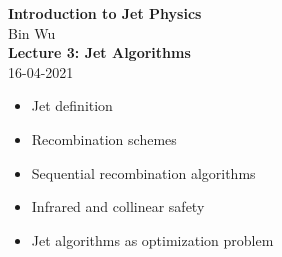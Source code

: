 \documentclass[9pt,a4paper,unknownkeysallowed,xcolor=dvipsnames,aspectratio=43]{beamer}
\begin{document}
\begin{frame}
\vspace*{\fill}
\begin{center}
{\Huge\bf\color{darkred} Introduction to Jet Physics}\\
\vspace{4mm}
    Bin Wu\\
    \vspace{8mm}
    {\bf\Large Lecture 3: Jet Algorithms}\\\vspace{4mm}
    {\color{darkblue} 16-04-2021}
\end{center}
\vspace{4mm}
\begin{itemize}
    \item[\color{darkred}\Large\bullet] Jet definition
    \vspace{2mm}
    \item[\color{darkred}\Large\bullet] Recombination schemes
    \vspace{2mm}
    \item[\color{darkred}\Large\bullet] Sequential recombination algorithms
    \vspace{2mm}
    \item[\color{darkred}\Large\bullet] Infrared and collinear safety
    \vspace{2mm}
    \item[\color{darkred}\Large\bullet] Jet algorithms as optimization problem

\end{itemize}
\vspace*{\fill}
\end{frame}
%
%
\end{document}
